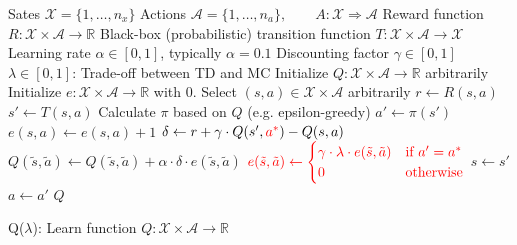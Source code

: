 \documentclass{article}
\DeclareMathOperator*{\argmax}{arg\,max}
\begin{document}
\begin{preview}
    \begin{algorithm}[H]
        \begin{algorithmic}
        \Require
        \Statex Sates $\mathcal{X} = \{1, \dots, n_x\}$
        \Statex Actions $\mathcal{A} = \{1, \dots, n_a\},\qquad A: \mathcal{X} \Rightarrow \mathcal{A}$
        \Statex Reward function $R: \mathcal{X} \times \mathcal{A} \rightarrow \mathbb{R}$
        \Statex Black-box (probabilistic) transition function $T: \mathcal{X} \times \mathcal{A} \rightarrow \mathcal{X}$
        \Statex Learning rate $\alpha \in [0, 1]$, typically $\alpha = 0.1$
        \Statex Discounting factor $\gamma \in [0, 1]$
        \Statex $\lambda \in [0, 1]$: Trade-off between TD and MC
            \State Initialize $Q: \mathcal{X} \times \mathcal{A} \rightarrow \mathbb{R}$ arbitrarily
            \State Initialize $e: \mathcal{X} \times \mathcal{A} \rightarrow \mathbb{R}$ with 0. 
                \State Select $(s, a) \in \mathcal{X} \times \mathcal{A}$ arbitrarily
                    \State $r \gets R(s, a)$
                    \State $s' \gets T(s, a)$ 
                    \State Calculate $\pi$ based on $Q$ (e.g. epsilon-greedy)
                    \State {$\color{red} a^* \gets \argmax_{\tilde{a}} Q(s', \tilde{a})$}
                    \State $a' \gets \pi(s')$
                    \State $e(s, a) \gets e(s, a) + 1$
                    \State $\delta \gets r + \gamma \cdot Q(s', {\color{red} a^*}) - Q(s, a)$
                        \State $Q(\tilde{s}, \tilde{a}) \gets Q(\tilde{s}, \tilde{a}) + \alpha \cdot \delta \cdot e(\tilde{s}, \tilde{a})$
                        \State ${\color{red} e(\tilde{s}, \tilde{a}) \gets \begin{cases}\gamma \cdot \lambda \cdot e(\tilde{s}, \tilde{a})&\text{if } a' = a^*\\
                                     0 &\text{otherwise}\end{cases}}$
                    \EndFor
                    \State $s \gets s'$
                    \State $a \gets a'$
                \EndWhile
            \EndWhile
            \Return $Q$
        \EndProcedure
        \end{algorithmic}
    \caption{Q($\lambda$): Learn function $Q: \mathcal{X} \times \mathcal{A} \rightarrow \mathbb{R}$}
    \label{alg:q-lambda}
    \end{algorithm}
\end{preview}
\end{document}
